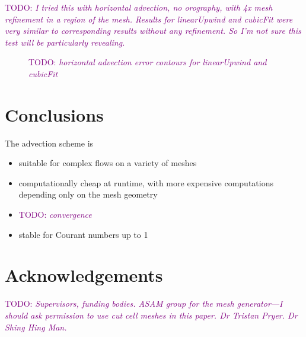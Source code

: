 \documentclass[times]{elsarticle}
\newcommand{\TODO}[1]{\textcolor{purple}{TODO: \emph{#1}}}
\begin{document}
\TODO{I tried this with horizontal advection, no orography, with 4x mesh refinement in a region of the mesh.  Results for linearUpwind and cubicFit were very similar to corresponding results without any refinement.  So I'm not sure this test will be particularly revealing.}

\begin{figure}
	\caption{\TODO{horizontal advection error contours for linearUpwind and cubicFit}}
\end{figure}





\section{Conclusions}

The advection scheme is
\begin{itemize}
	\item suitable for complex flows on a variety of meshes
	\item computationally cheap at runtime, with more expensive computations depending only on the mesh geometry
	\item \TODO{convergence}
	\item stable for Courant numbers up to 1
\end{itemize}

\section{Acknowledgements}
\TODO{Supervisors, funding bodies.  ASAM group for the mesh generator---I should ask permission to use cut cell meshes in this paper.  Dr Tristan Pryer.  Dr Shing Hing Man.}





\end{document}
